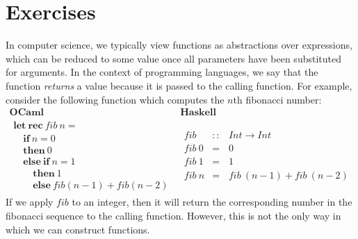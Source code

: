 \documentclass[10pt,a4paper]{exam} %
\begin{document}
\section*{Exercises}

\begin{questions}
    \question In computer science, we typically view functions as abstractions over expressions, which can be reduced to some value once all parameters have been substituted for arguments. In the context of programming languages, we say that the function \emph{returns} a value because it is passed to the calling function. For example, consider the following function which computes the $n$th fibonacci number:
    \begin{displaymath}
    \begin{array}{c|c}
    \textbf{OCaml} & \textbf{Haskell} \\ \hline
    \begin{array}{l}
    \mathbf{let}~\mathbf{rec}~\mathit{fib}~n = \\
    \quad \mathbf{if}~n=0 \\
    \quad \mathbf{then}~0 \\
    \quad \mathbf{else}~\mathbf{if}~n=1 \\
    \qquad \mathbf{then}~1 \\
    \qquad \mathbf{else}~\mathit{fib}(n-1) + \mathit{fib}(n-2)
    \end{array} &
    \begin{array}{lcl}
    \mathit{fib} & :: & \mathit{Int} \to \mathit{Int} \\
    \mathit{fib}~0 & = & 0 \\
    \mathit{fib}~1 & = & 1 \\
    \mathit{fib}~n & = & \mathit{fib}~(n-1) + \mathit{fib}~(n-2)
    \end{array}
    \end{array}
    \end{displaymath}
    If we apply $\mathit{fib}$ to an integer, then it will return the corresponding number in the fibonacci sequence to the calling function. However, this is not the only way in which we can construct functions.
    

\end{questions}
\end{document}
